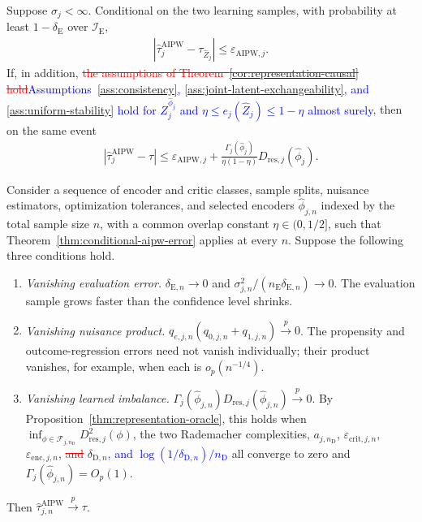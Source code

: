 \begin{theorem}
\label{thm:conditional-aipw-error}
\normalfont

Suppose $\sigma_j<\infty$. Conditional on the two learning samples, with probability at least $1-\delta_{\mathrm E}$ over $\mathcal I_{\mathrm E}$,
\begin{align}
|\widehat\tau_j^{\mathrm{AIPW}}-\tau_{\widehat Z_j}|
\le
\varepsilon_{\mathrm{AIPW},j}.
\label{eq:conditional-aipw-error}
\end{align}
If, in addition, \textcolor{red}{\sout{the assumptions of Theorem~\mbox{\ref{cor:representation-causal}} hold}}\textcolor{blue}{Assumptions~\ref{ass:consistency}, \ref{ass:joint-latent-exchangeability}, and \ref{ass:uniform-stability} hold for $Z_j^{\widehat\phi_j}$ and $\eta\le e_j(\widehat Z_j)\le1-\eta$ almost surely}, then on the same event
\begin{align}
|\widehat\tau_j^{\mathrm{AIPW}}-\tau|
\le
\varepsilon_{\mathrm{AIPW},j}
+
\frac{\Gamma_j(\widehat\phi_j)}{\eta(1-\eta)}
D_{\mathrm{res},j}(\widehat\phi_j).
\label{eq:end-to-end-sensitivity}
\end{align}

\end{theorem}

\begin{corollary}[Consistency]
\label{cor:learned-aipw-consistency}
\normalfont

Consider a sequence of encoder and critic classes, sample splits, nuisance estimators, optimization tolerances, and selected encoders $\widehat\phi_{j,n}$ indexed by the total sample size $n$, with a common overlap constant $\eta\in(0,1/2]$, such that Theorem~\ref{thm:conditional-aipw-error} applies at every $n$. Suppose the following three conditions hold.
\begin{enumerate}[label=(C\arabic*),leftmargin=*]
\item \textit{Vanishing evaluation error.} $\delta_{\mathrm E,n}\to0$ and $\sigma_{j,n}^2/(n_{\mathrm E}\delta_{\mathrm E,n})\to0$. The evaluation sample grows faster than the confidence level shrinks.
\item \textit{Vanishing nuisance product.} $q_{e,j,n}(q_{0,j,n}+q_{1,j,n})\xrightarrow{p}0$. The propensity and outcome-regression errors need not vanish individually; their product vanishes, for example, when each is $o_p(n^{-1/4})$.
\item \textit{Vanishing learned imbalance.} $\Gamma_j(\widehat\phi_{j,n})D_{\mathrm{res},j}(\widehat\phi_{j,n})\xrightarrow{p}0$. By Proposition~\ref{thm:representation-oracle}, this holds when $\inf_{\phi\in\mathcal F_{j,n_{\mathrm D}}}D_{\mathrm{res},j}^2(\phi)$, the two Rademacher complexities, $a_{j,n_{\mathrm D}}$, $\varepsilon_{\mathrm{crit},j,n}$, $\varepsilon_{\mathrm{enc},j,n}$, \textcolor{red}{\sout{and}} $\delta_{\mathrm D,n}$\textcolor{blue}{, and $\log(1/\delta_{\mathrm D,n})/n_{\mathrm D}$} all converge to zero and $\Gamma_j(\widehat\phi_{j,n})=O_p(1)$.
\end{enumerate}
Then $\widehat\tau_{j,n}^{\mathrm{AIPW}}\xrightarrow{p}\tau$.

\end{corollary}


